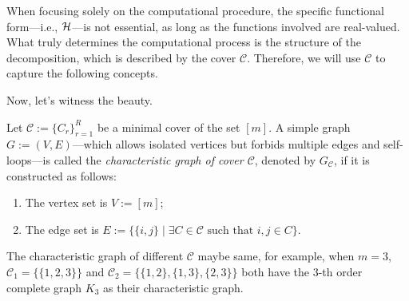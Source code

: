 \documentclass[letterpaper,11pt]{article}
\newcommand{\cover}{\mathcal{C}}
\newcommand{\graphcoverp}[1]{G_{#1}}
\begin{document}
\begin{bibunit}[plainnat]
\begin{remark}
    When focusing solely on the computational procedure, the specific functional form—i.e., ${\mathcal{H}}$—is not essential, as long as the functions involved are real-valued. What truly determines the computational process is the structure of the decomposition, which is described by the cover $\cover$. Therefore, we will use $\cover$ to capture the following concepts.
\end{remark}

Now, let's witness the beauty.

\begin{definition}\label{def:graph}
    Let $\cover := \{C_r\}_{r=1}^R$ be a minimal cover of the set $[m]$. A simple graph $G := (V, E)$—which allows isolated vertices but forbids multiple edges and self-loops—is called the \emph{characteristic graph of cover $\cover$}, denoted by $\graphcoverp{\cover}$, if it is constructed as follows:
    \begin{enumerate}
        \item The vertex set is $V := [m]$;
        \item The edge set is $E := \{\{i,j\} \mid \exists C \in \cover \text{ such that } i, j \in C\}$.
    \end{enumerate}

\end{definition}
\begin{remark}
    The characteristic graph of different $\cover$ maybe same, for example, when $m=3$, $\cover_{1} = \{ \{ 1,2,3 \}\}$ and $\cover_{2} = \{ \{ 1,2\}, \{ 1,3\}, \{ 2, 3 \}\}$ both have the $3$-th order complete graph $K_{3}$ as their characteristic graph.
\end{remark}



\end{bibunit}
\end{document}
